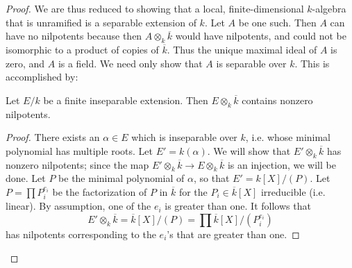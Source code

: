 \begin{proof}
We are thus reduced to showing that a local, finite-dimensional $k$-algebra
that is unramified is a separable extension of $k$. Let $A$ be one such. Then
$A$ can have no nilpotents because then $A \otimes_k \overline{k}$ would have
nilpotents, and could not be isomorphic to a product of copies of
$\overline{k}$. 
Thus the unique maximal ideal of $A$ is zero, and $A$ is a field.
We need only show that $A$ is separable over $k$. This is accomplished by:

\begin{lemma} 
Let $E/k$ be a finite inseparable extension. Then $E \otimes_k \overline{k}$
contains nonzero nilpotents. 
\end{lemma} 

\begin{proof} There exists an $\alpha \in E$ which is inseparable over $k$,
i.e. whose minimal polynomial has multiple roots. 
Let $E' = k(\alpha)$. We will show that $E' \otimes_k \overline{k}$ has
nonzero nilpotents; since the map $E' \otimes_k \overline{k} \to E \otimes_k
\overline{k}$ is an injection, we will be done. 
Let $P$ be the minimal polynomial of $\alpha$, so that $E' = k[X]/(P)$. 
Let $P = \prod P_i^{e_i}$ be the factorization of $P$ in $\overline{k}$ for
the $P_i \in \overline{k}[X]$ irreducible (i.e. linear). By
assumption, one of the $e_i$ is greater than one.
It follows that 
\[ E' \otimes_k \overline{k} = \overline{k}[X]/(P) = \prod
\overline{k}[X]/(P_i^{e_i})  \]
has nilpotents corresponding to the $e_i$'s that are greater than one.
\end{proof} 

\end{proof} 
\begin{comment}
We now come to the result that explains why the present theory is connected
with Zariski's Main Theorem.
\begin{corollary} \label{unrisqf} 
An unramified morphism $A \to B$ is quasi-finite.
\end{corollary} 
\begin{proof} 
Recall that a morphism of rings is \emph{quasi-finite} if the associated map
on spectra is. Equivalently, the morphism must be of finite type and have
finite fibers. But by assumption $A \to B$ is of finite type. Moreover, if
$\mathfrak{p} \in \spec A$ and $k(\mathfrak{p})$ is the residue field, then
$k(\mathfrak{p}) \to B \otimes_A k(\mathfrak{p})$ is \emph{finite} by the
above results, so the fibers are finite. 
\end{proof} 


\end{comment} 



